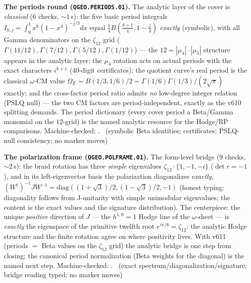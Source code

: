 \par\smallskip\noindent\textbf{The periods round
(\texttt{QGEO.PERIODS.01}).}
The analytic layer of the cover is \emph{classical} ($6$ checks,
${\sim}1$\,s): the five basic period integrals
$I_{k,j}=\int_0^1x^k(1-x^4)^{-j/3}dx$ equal
$\tfrac14B(\tfrac{k+1}4,1-\tfrac j3)$ \emph{exactly} (symbolic), with
all Gamma denominators on the $\zeta_{12}$ grid
($\Gamma(11/12),\Gamma(7/12),\Gamma(5/12),\Gamma(1/12)$) --- the
$12=|\mu_4|\cdot|\mu_3|$ structure appears in the analytic layer;
the $\mu_4$ rotation acts on actual periods with the exact
characters $i^{k+1}$ ($40$-digit certificates); the quotient curve's
real period is the classical $\omega$-CM value
$\Omega_E=B(1/3,1/6)/2=\Gamma(1/6)\Gamma(1/3)/(2\sqrt\pi)$ exactly;
and the cross-factor period ratio admits \emph{no} low-degree
integer relation (PSLQ null) --- the two CM factors are
period-independent, exactly as the v610 splitting demands.  The
period dictionary (every cover period a Beta/Gamma monomial on the
$12$-grid) is the named analytic resource for the Hodge/RP
comparisons.
Machine-checked: .
\mE\ (symbolic Beta identities; certificates; PSLQ-null consistency;
no marker moves)
\par\smallskip

\par\smallskip\noindent\textbf{The polarization frame
(\texttt{QGEO.POLFRAME.01}).}
The form-level bridge ($9$ checks, ${\sim}2$\,s): the braid rotation
has three \emph{simple} eigenvalues $\zeta_{12}\cdot\{1,-1,-i\}$
($\det r=-1$), and in its left-eigenvector basis the polarization
diagonalizes \emph{exactly},
$(W^\dagger)^{-1}JW^{-1}=\mathrm{diag}((1{+}\sqrt3)/2,(1{-}\sqrt3)/2,-1)$
(honest typing: diagonality follows from J-unitarity with simple
unimodular eigenvalues; the content is the exact values and the
signature distribution).  The centerpiece: the unique \emph{positive}
direction of $J$ --- the $h^{1,0}=1$ Hodge line of the
$\omega$-sheet --- is \emph{exactly} the eigenspace of the primitive
twelfth root $e^{i\pi/6}=\zeta_{12}$: the analytic Hodge structure
and the finite rotation agree on where positivity lives.  With v611
(periods $=$ Beta values on the $\zeta_{12}$ grid) the analytic
bridge is one step from closing; the canonical period normalization
(Beta weights for the diagonal) is the named next step.
Machine-checked: .
\mE\ (exact spectrum/diagonalization/signature; bridge reading
typed; no marker moves)
\par\smallskip

